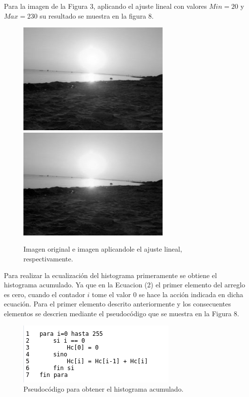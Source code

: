 \documentclass[conference]{IEEEtran}
\begin{document}
Para la imagen de la Figura 3, aplicando el ajuste lineal con valores $Min=20$ y $Max=230$ su resultado se muestra en la figura 8.
\begin{figure}[h]
	\begin{center}
		\setlength{\unitlength}{0.00105in}
		\includegraphics[scale=0.50]{./images/playa.png}
		\includegraphics[scale=0.50]{./images/playa_out.png}
	\end{center}
	\caption{Imagen original e imagen aplicandole el ajuste lineal, respectivamente.}
\end{figure}

Para realizar la ecualizaci\'on del histograma primeramente se obtiene el histograma acumulado. Ya que en la Ecuacion (2) el primer elemento del arreglo es cero, cuando el contador $i$ tome el valor $0$ se hace la acci\'on indicada en dicha ecuaci\'on. Para el primer elemento descrito anteriormente y los consecuentes elementos se descrien mediante el pseudoc\'odigo que se muestra en la Figura 8.

\begin{figure}[h]
	\begin{center}
		\setlength{\unitlength}{0.00105in}
		\includegraphics[scale=0.50]{./images/algoritmo2.png}
	\end{center}
	\caption{Pseudoc\'odigo para obtener el histograma acumulado.}
\end{figure}
\end{document}
